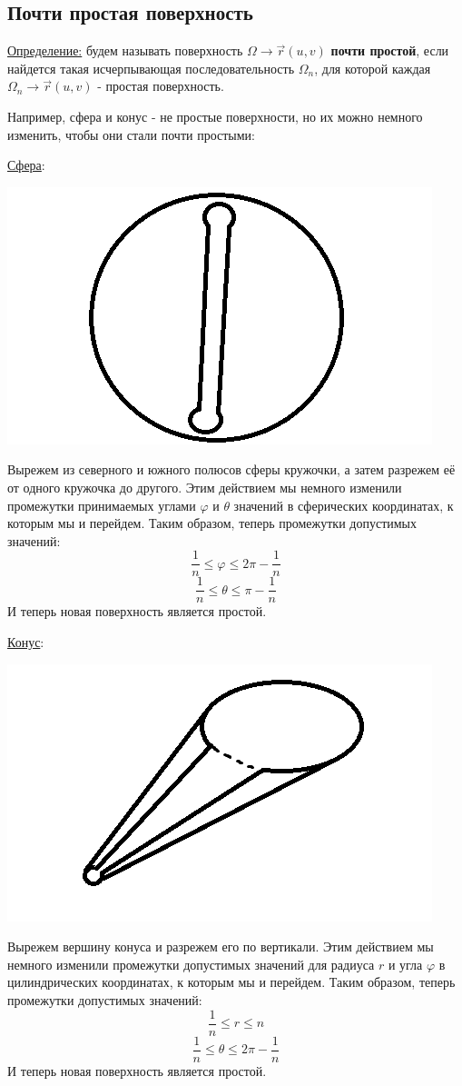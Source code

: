 \documentclass[12pt]{article}
\begin{document}
\subsection{Почти простая поверхность}
\uline{Определение:} будем называть поверхность $\Omega \to \overrightarrow{r}(u,v)$ \textbf{почти простой}, если найдется такая исчерпывающая последовательность $\Omega_n$, для которой  каждая $\Omega_n \to \overrightarrow{r}(u,v)$ - простая поверхность.\par
Например, сфера и конус - не простые поверхности, но их можно немного изменить, чтобы они стали почти простыми:\par
\uline{Сфера}:\par
\includegraphics{sphereNotSimple}\par
Вырежем из северного и южного полюсов сферы кружочки, а затем разрежем её от одного кружочка до другого. Этим действием мы немного изменили промежутки принимаемых углами $\varphi$ и $\theta$ значений в сферических координатах, к которым мы и перейдем. Таким образом, теперь промежутки допустимых значений:
$$\frac{1}{n} \leq \varphi \leq 2 \pi - \frac{1}{n}$$
$$\frac{1}{n} \leq \theta \leq \pi - \frac{1}{n}$$
И теперь новая поверхность является простой.\par
\uline{Конус}:\par
\includegraphics{coneNotSimple}\par
Вырежем вершину конуса и разрежем его по вертикали. Этим действием мы немного изменили промежутки допустимых значений для радиуса $r$ и угла $\varphi$ в цилиндрических координатах, к которым мы и перейдем. Таким образом, теперь промежутки допустимых значений:
$$\frac{1}{n} \leq r \leq n$$
$$\frac{1}{n} \leq \theta \leq 2 \pi - \frac{1}{n}$$
И теперь новая поверхность является простой.\par
\end{document}

